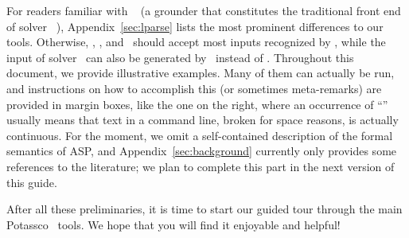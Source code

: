 
For readers familiar with \lparse~\cite{lparseManual}
(a grounder that constitutes the traditional front end of solver \smodels~\cite{siniso02a}),
Appendix~\ref{sec:lparse}
lists the most prominent differences to our tools.
Otherwise, \gringo, \clingo, and \iclingo\ should accept most inputs recognized by \lparse,
while the input of solver \clasp\ can also be generated by \lparse\ instead of \gringo.
Throughout this document, we provide illustrative examples.
Many of them can actually be run, and instructions on how to accomplish this
(or sometimes meta-remarks)
are provided in margin boxes, like the one on the right,%
where an occurrence of ``''
usually means that text in a command line, broken for space reasons, is actually continuous.
For the moment,
we omit a self-contained description of the formal semantics of ASP,
and Appendix~\ref{sec:background} currently only provides some references
to the literature; we plan to complete this part in the next version
of this guide.

After all these preliminaries, it is time to start our guided tour
through the main Potassco~\cite{potassco} tools.
We hope that you will find it enjoyable and helpful!

